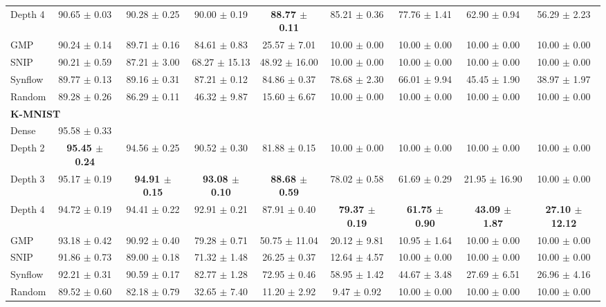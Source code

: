 \begin{table}[b]
{\begin{tabular}{lcccccccc}
Depth 4 & 90.65 $\pm$ 0.03 & 90.28 $\pm$ 0.25 & 90.00 $\pm$ 0.19 & \textbf{88.77 $\pm$ 0.11} & 85.21 $\pm$ 0.36 & 77.76 $\pm$ 1.41 & 62.90 $\pm$ 0.94 & 56.29 $\pm$ 2.23 \\
GMP & 90.24 $\pm$ 0.14 & 89.71 $\pm$ 0.16 & 84.61 $\pm$ 0.83 & 25.57 $\pm$ 7.01 & 10.00 $\pm$ 0.00 & 10.00 $\pm$ 0.00 & 10.00 $\pm$ 0.00 & 10.00 $\pm$ 0.00 \\
SNIP & 90.21 $\pm$ 0.59 & 87.21 $\pm$ 3.00 & 68.27 $\pm$ 15.13 & 48.92 $\pm$ 16.00 & 10.00 $\pm$ 0.00 & 10.00 $\pm$ 0.00 & 10.00 $\pm$ 0.00 & 10.00 $\pm$ 0.00 \\
Synflow & 89.77 $\pm$ 0.13 & 89.16 $\pm$ 0.31 & 87.21 $\pm$ 0.12 & 84.86 $\pm$ 0.37 & 78.68 $\pm$ 2.30 & 66.01 $\pm$ 9.94 & 45.45 $\pm$ 1.90 & 38.97 $\pm$ 1.97 \\
Random & 89.28 $\pm$ 0.26 & 86.29 $\pm$ 0.11 & 46.32 $\pm$ 9.87 & 15.60 $\pm$ 6.67 & 10.00 $\pm$ 0.00 & 10.00 $\pm$ 0.00 & 10.00 $\pm$ 0.00 & 10.00 $\pm$ 0.00 \\
\hline
\multicolumn{9}{l}{\textbf{K-MNIST}} \\
Dense & 95.58 $\pm$ 0.33 \\
Depth 2 & \textbf{95.45 $\pm$ 0.24} & 94.56 $\pm$ 0.25 & 90.52 $\pm$ 0.30 & 81.88 $\pm$ 0.15 & 10.00 $\pm$ 0.00 & 10.00 $\pm$ 0.00 & 10.00 $\pm$ 0.00 & 10.00 $\pm$ 0.00 \\
Depth 3 & 95.17 $\pm$ 0.19 & \textbf{94.91 $\pm$ 0.15} & \textbf{93.08 $\pm$ 0.10} & \textbf{88.68 $\pm$ 0.59} & 78.02 $\pm$ 0.58 & 61.69 $\pm$ 0.29 & 21.95 $\pm$ 16.90 & 10.00 $\pm$ 0.00 \\
Depth 4 & 94.72 $\pm$ 0.19 & 94.41 $\pm$ 0.22 & 92.91 $\pm$ 0.21 & 87.91 $\pm$ 0.40 & \textbf{79.37 $\pm$ 0.19} & \textbf{61.75 $\pm$ 0.90} & \textbf{43.09 $\pm$ 1.87} & \textbf{27.10 $\pm$ 12.12} \\
GMP & 93.18 $\pm$ 0.42 & 90.92 $\pm$ 0.40 & 79.28 $\pm$ 0.71 & 50.75 $\pm$ 11.04 & 20.12 $\pm$ 9.81 & 10.95 $\pm$ 1.64 & 10.00 $\pm$ 0.00 & 10.00 $\pm$ 0.00 \\
SNIP & 91.86 $\pm$ 0.73 & 89.00 $\pm$ 0.18 & 71.32 $\pm$ 1.48 & 26.25 $\pm$ 0.37 & 12.64 $\pm$ 4.57 & 10.00 $\pm$ 0.00 & 10.00 $\pm$ 0.00 & 10.00 $\pm$ 0.00 \\
Synflow & 92.21 $\pm$ 0.31 & 90.59 $\pm$ 0.17 & 82.77 $\pm$ 1.28 & 72.95 $\pm$ 0.46 & 58.95 $\pm$ 1.42 & 44.67 $\pm$ 3.48 & 27.69 $\pm$ 6.51 & 26.96 $\pm$ 4.16 \\
Random & 89.52 $\pm$ 0.60 & 82.18 $\pm$ 0.79 & 32.65 $\pm$ 7.40 & 11.20 $\pm$ 2.92 & 9.47 $\pm$ 0.92 & 10.00 $\pm$ 0.00 & 10.00 $\pm$ 0.00 & 10.00 $\pm$ 0.00 \\

\end{tabular}}
\end{table}
